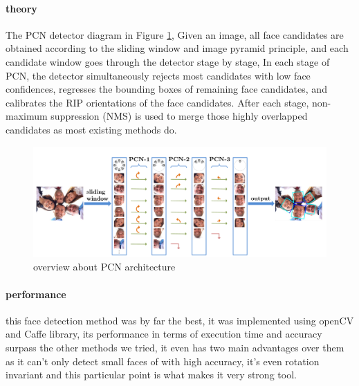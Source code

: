 \paragraph{theory}
The PCN detector diagram in Figure \ref{fig:PCN_archOverview}, Given an image, all face candidates are obtained according to the sliding window and image pyramid principle, and each candidate window goes through the detector stage by stage, In each stage of PCN, the detector simultaneously rejects most candidates with low face confidences, regresses the bounding boxes of remaining face candidates, and calibrates the RIP orientations of the face candidates. After each stage, non-maximum suppression (NMS) is used to merge those highly overlapped candidates as most existing methods do.
\begin{figure}
	\centering
	\includegraphics[width=\textwidth]{images/PCN_archOverview.png}
	\caption{overview about PCN architecture \cite{PCN}}
	\label{fig:PCN_archOverview}
\end{figure}
\paragraph{performance}
this face detection method was by far the best, it was implemented using openCV and Caffe library, its performance in terms of execution time and accuracy surpass the other methods we tried, it even has two main advantages over them as it can't only detect small faces of with high accuracy, it's even rotation invariant and this particular point is what makes it very strong tool.
